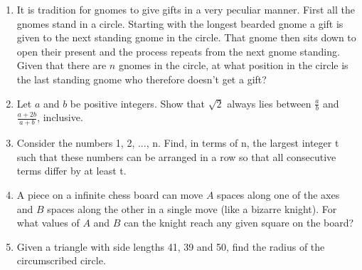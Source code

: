 \documentclass[a4paper]{article}
\begin{document}
\begin{enumerate}
    \item
    It is tradition for gnomes to give gifts in a very peculiar manner. First all the gnomes stand in a circle. Starting with the longest bearded gnome a gift is given to the next standing gnome in the circle. That gnome then sits down to open their present and the process repeats from the next gnome standing. Given that there are $n$ gnomes in the circle, at what position in the circle is the last standing gnome who therefore doesn’t get a gift?
    
    \item
    Let $a$ and $b$ be positive integers. Show that $\sqrt{2}$ always lies between $\frac{a}{b}$ and $\frac{a+2b}{a+b}$, inclusive.
    
    \item
    Consider the numbers 1, 2, ..., n. Find, in terms of n, the largest integer t such that these numbers can be arranged in a row so that all consecutive terms differ by at least t.
    
    \item
    A piece on a infinite chess board can move $A$ spaces along one of the axes and $B$ spaces along the other in a single move (like a bizarre knight). For what values of $A$ and $B$ can the knight reach any given square on the board?
    
    \item
    Given a triangle with side lengths 41, 39 and 50, find the radius of the circumscribed circle.
    
    
    
    
\end{enumerate}
\end{document}
